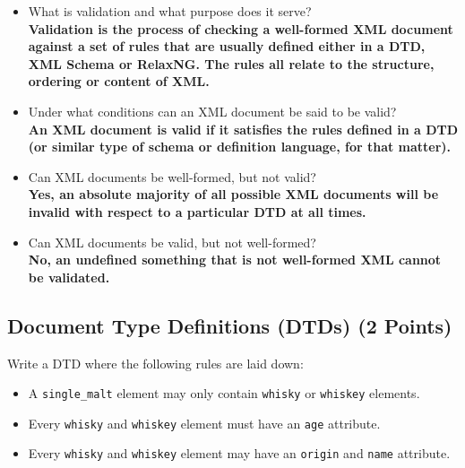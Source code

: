 \documentclass[a4paper, 12pt]{scrartcl}
\begin{document}
\begin{itemize}
\item What is validation and what purpose does it serve? \\

\textbf{Validation is the process of checking a well-formed XML document against a set of rules that are usually defined either in a DTD, XML Schema or RelaxNG. The rules all relate to the structure, ordering or content of XML.}

\item Under what conditions can an XML document be said to be valid? \\

\textbf{An XML document is valid if it satisfies the rules defined in a DTD (or similar type of schema or definition language, for that matter).}

\item Can XML documents be well-formed, but not valid? \\

\textbf{Yes, an absolute majority of all possible XML documents will be invalid with respect to a particular DTD at all times.}

\item Can XML documents be valid, but not well-formed? \\

\textbf{No, an undefined something that is not well-formed XML cannot be validated.}
\end{itemize}

\noindent 

\subsection{Document Type Definitions (DTDs) (2 Points)}


Write a DTD where the following rules are laid down:
\begin{itemize}
   \item A \texttt{single\_malt} element may only contain \texttt{whisky} or \texttt{whiskey} elements.
   \item Every \texttt{whisky} and \texttt{whiskey} element must have an \texttt{age} attribute.
   \item Every \texttt{whisky} and \texttt{whiskey} element may have an \texttt{origin} and \texttt{name} attribute.
\end{itemize}



\end{document}

